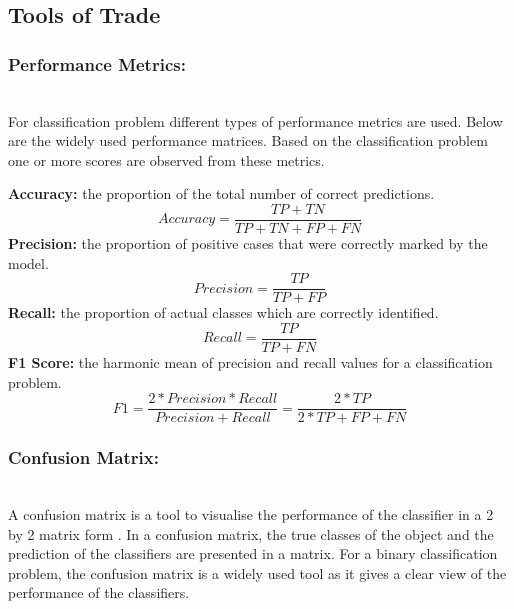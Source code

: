 \subsection{Tools of Trade}\label{subsec:tools-of-trade}

\subsubsection{Performance Metrics:}\hspace*{\fill} \\
For classification problem different types of performance metrics are used. Below are the widely used performance matrices. Based on the classification problem one or more scores are observed from these metrics. 

\begin{outline}
 \1 \textbf{Accuracy:} the proportion of the total number of correct predictions.
    \begin{equation} \label{eq:aqquracy}
        Accuracy = \frac{TP+TN}{TP+TN+FP+FN}
    \end{equation}
 \1 \textbf{Precision:} the proportion of positive cases that were correctly marked by the model.
    \begin{equation} \label{eq:precision}
        Precision = \frac{TP}{TP+FP}
    \end{equation}
 \1 \textbf{Recall:} the proportion of actual classes which are correctly identified.
    \begin{equation} \label{eq:recall}
        Recall = \frac{TP}{TP+FN}
    \end{equation}
 \1 \textbf{F1 Score:}  the harmonic mean of precision and recall values for a classification problem. 
    \begin{equation}
        F1 = \frac{2*Precision*Recall}{Precision+Recall} = \frac{2*TP}{2*TP+FP+FN}
    \end{equation}
\end{outline}


\subsubsection{Confusion Matrix:}\hspace*{\fill} \\
A confusion matrix is a tool to visualise the performance of the classifier in a 2 by 2 matrix form \cite{Ting2017}. In a confusion matrix, the true classes of the object and the prediction of the classifiers are presented in a matrix. For a binary classification problem, the confusion matrix is a widely used tool as it gives a clear view of the performance of the classifiers. 

